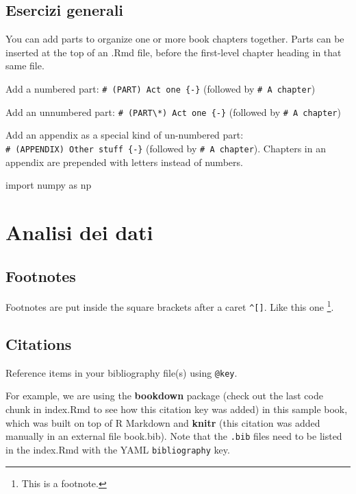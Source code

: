 \documentclass[
]{book}
\newenvironment{Shaded}{\begin{snugshade}}{\end{snugshade}}
\newcommand{\ImportTok}[1]{#1}
\newcommand{\NormalTok}[1]{#1}
\theoremstyle{definition}
\theoremstyle{definition}
\theoremstyle{definition}
\theoremstyle{definition}
\theoremstyle{remark}
\begin{document}
\hypertarget{esercizi-generali}{%
\section{Esercizi generali}\label{esercizi-generali}}

You can add parts to organize one or more book chapters together. Parts can be inserted at the top of an .Rmd file, before the first-level chapter heading in that same file.

Add a numbered part: \texttt{\#\ (PART)\ Act\ one\ \{-\}} (followed by \texttt{\#\ A\ chapter})

Add an unnumbered part: \texttt{\#\ (PART\textbackslash{}*)\ Act\ one\ \{-\}} (followed by \texttt{\#\ A\ chapter})

Add an appendix as a special kind of un-numbered part: \texttt{\#\ (APPENDIX)\ Other\ stuff\ \{-\}} (followed by \texttt{\#\ A\ chapter}). Chapters in an appendix are prepended with letters instead of numbers.

\begin{Shaded}
\begin{Highlighting}[]
\ImportTok{import}\NormalTok{ numpy }\ImportTok{as}\NormalTok{ np}
\end{Highlighting}
\end{Shaded}

\hypertarget{analisi-dei-dati}{%
\chapter{Analisi dei dati}\label{analisi-dei-dati}}

\hypertarget{footnotes}{%
\section{Footnotes}\label{footnotes}}

Footnotes are put inside the square brackets after a caret \texttt{\^{}{[}{]}}. Like this one \footnote{This is a footnote.}.

\hypertarget{citations}{%
\section{Citations}\label{citations}}

Reference items in your bibliography file(s) using \texttt{@key}.

For example, we are using the \textbf{bookdown} package \citep{R-bookdown} (check out the last code chunk in index.Rmd to see how this citation key was added) in this sample book, which was built on top of R Markdown and \textbf{knitr} \citep{xie2015} (this citation was added manually in an external file book.bib). Note that the \texttt{.bib} files need to be listed in the index.Rmd with the YAML \texttt{bibliography} key.
\end{document}
